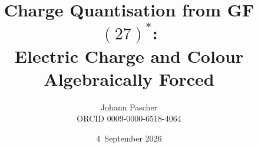 \documentclass[11pt,a4paper]{report}
\title{Charge Quantisation from GF$(27)^*$:\\[0.5em]
  \large Electric Charge and Colour Algebraically Forced}
\date{4~September 2026}
\author{Johann Pascher\\\small ORCID 0009-0000-6518-4064}
\begin{document}
\renewcommand{\thechapter}{}
\renewcommand{\thesection}{\arabic{section}}
\maketitle
\tableofcontents

\end{document}
